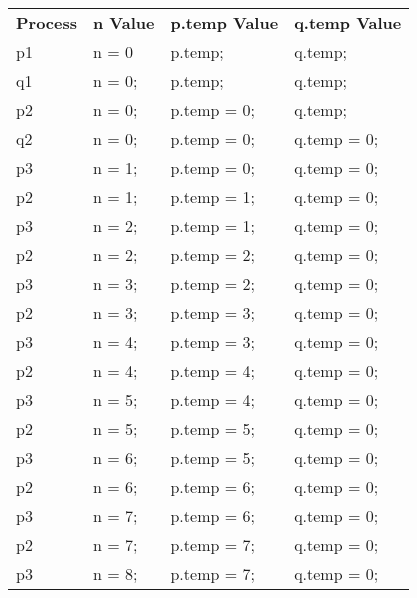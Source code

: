 \documentclass[]{article}
\begin{document}
\begin{table}[h]
\begin{tabular}{llll}
\textbf{Process} & \textbf{n Value} & \textbf{p.temp Value} & \textbf{q.temp Value} \\
p1               & n = 0            & p.temp;               & q.temp;               \\
q1               & n = 0;           & p.temp;               & q.temp;               \\
p2               & n = 0;           & p.temp = 0;           & q.temp;               \\
q2               & n = 0;           & p.temp = 0;           & q.temp = 0;           \\
p3               & n = 1;           & p.temp = 0;           & q.temp = 0;           \\
p2               & n = 1;           & p.temp = 1;           & q.temp = 0;           \\
p3               & n = 2;           & p.temp = 1;           & q.temp = 0;           \\
p2               & n = 2;           & p.temp = 2;           & q.temp = 0;           \\
p3               & n = 3;           & p.temp = 2;           & q.temp = 0;           \\
p2               & n = 3;           & p.temp = 3;           & q.temp = 0;           \\
p3               & n = 4;           & p.temp = 3;           & q.temp = 0;           \\
p2               & n = 4;           & p.temp = 4;           & q.temp = 0;           \\
p3               & n = 5;           & p.temp = 4;           & q.temp = 0;           \\
p2               & n = 5;           & p.temp = 5;           & q.temp = 0;           \\
p3               & n = 6;           & p.temp = 5;           & q.temp = 0;           \\
p2               & n = 6;           & p.temp = 6;           & q.temp = 0;           \\
p3               & n = 7;           & p.temp = 6;           & q.temp = 0;           \\
p2               & n = 7;           & p.temp = 7;           & q.temp = 0;           \\
p3               & n = 8;           & p.temp = 7;           & q.temp = 0;           \\

\end{tabular}
\end{table}
\end{document}
